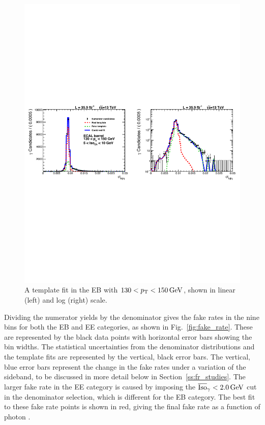 \begin{figure}[!htbp]
  \centering
  \includegraphics[width=1.0\textwidth]{figures/fakeRatePlotEB_pT130To150_chIso5To10.pdf}
  \caption{A template fit in the EB with $130<p_{\mathrm{T}}<150\,\text{Ge\hspace{-.08em}V}$, shown in linear (left) and log (right) scale.}
  \label{fig:template_fit}
\end{figure}

Dividing the numerator yields by the denominator gives the fake rates in the nine \pt bins for both the EB and EE categories, as shown in Fig.~\ref{fig:fake_rate}. These are represented by the black data points with horizontal error bars showing the bin widths. The statistical uncertainties from the denominator distributions and the template fits are represented by the vertical, black error bars. The vertical, blue error bars represent the change in the fake rates under a variation of the \chiso sideband, to be discussed in more detail below in Section~\ref{ss:fr_studies}. The larger fake rate in the EE category is caused by imposing the $\overline{\mbox{Iso}}_\gamma < 2.0\,\text{Ge\hspace{-.08em}V}$ cut in the denominator selection, which is different for the EB category. The best fit to these fake rate points is shown in red, giving the final fake rate as a function of photon \pt.

